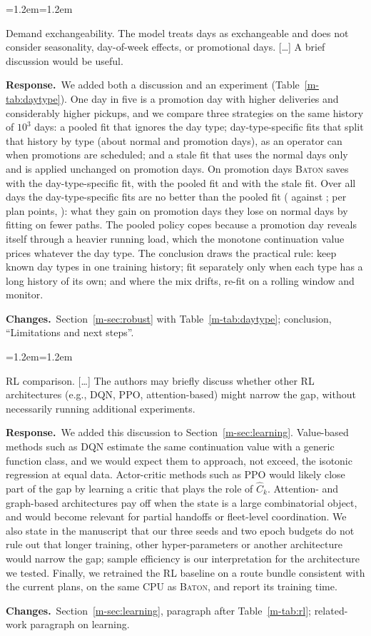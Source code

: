 \documentclass[11pt]{article}
\newenvironment{comment}{\par\medskip\noindent\color{rev}\itshape
  \begin{list}{}{\leftmargin=1.2em\rightmargin=1.2em}\item[]}%
  {\end{list}\par}
\newcommand{\resp}{\par\noindent\textbf{Response.}\ }
\newcommand{\chg}{\par\noindent\textbf{Changes.}\ }
\newcommand{\sref}[1]{Section~\ref{m-#1}}
\newcommand{\tref}[1]{Table~\ref{m-#1}}
\newcommand{\BATON}{\textsc{Baton}}
\begin{document}
\begin{comment}
Demand exchangeability. The model treats days as exchangeable and does
not consider seasonality, day-of-week effects, or promotional days.
[\ldots] A brief discussion would be useful.
\end{comment}
\resp We added both a discussion and an experiment (\tref{tab:daytype}).
One day in five is a promotion day with higher deliveries and
considerably higher pickups, and we compare three strategies on the
same history of $10^3$ days: a pooled fit that ignores the day type;
day-type-specific fits that split that history by type (about
\dtNNormal{} normal and \dtNPromo{} promotion days), as an operator can
when promotions are scheduled; and a stale fit that uses the normal days
only and is applied unchanged on promotion days. On promotion days
\BATON{} saves \dtPromoAware{} with the day-type-specific fit,
\dtPromoPooled{} with the pooled fit and \dtPromoStale{} with the stale
fit. Over all days the day-type-specific fits are no better than the
pooled fit (\dtAllAware{} against \dtAllPooled; per plan
\dtAwarePooledDelta{} points, \dtAwarePooledCI): what they gain on
promotion days they lose on normal days by fitting on fewer paths. The
pooled policy copes because a promotion day reveals itself through a
heavier running load, which the monotone continuation value prices
whatever the day type. The conclusion draws the practical rule: keep
known day types in one training history; fit separately only when each
type has a long history of its own; and where the mix drifts, re-fit on
a rolling window and monitor.
\chg \sref{sec:robust} with \tref{tab:daytype}; conclusion,
``Limitations and next steps''.

\begin{comment}
RL comparison. [\ldots] The authors may briefly discuss whether other RL
architectures (e.g., DQN, PPO, attention-based) might narrow the gap,
without necessarily running additional experiments.
\end{comment}
\resp We added this discussion to \sref{sec:learning}. Value-based
methods such as DQN estimate the same continuation value with a generic
function class, and we would expect them to approach, not exceed, the
isotonic regression at equal data. Actor-critic methods such as PPO
would likely close part of the gap by learning a critic that plays the
role of $\widehat C_k$. Attention- and graph-based architectures pay off
when the state is a large combinatorial object, and would become
relevant for partial handoffs or fleet-level coordination. We also
state in the manuscript that our three seeds and two epoch budgets do not
rule out that longer training, other hyper-parameters or another
architecture would narrow the gap; sample efficiency is our
interpretation for the architecture we tested. Finally, we
retrained the RL baseline on a route bundle consistent with the current
plans, on the same CPU as \BATON, and report its training time.
\chg \sref{sec:learning}, paragraph after \tref{tab:rl}; related-work
paragraph on learning.
\end{document}
